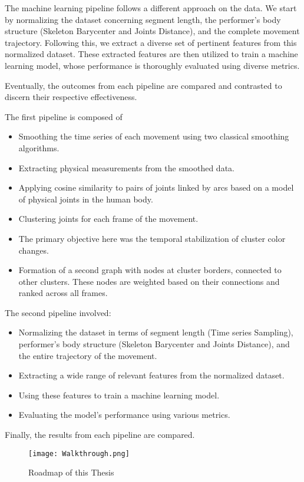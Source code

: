 The machine learning pipeline follows a different approach on the data. 
We start by normalizing the dataset concerning segment length, the performer's body structure (Skeleton Barycenter and Joints Distance), and the complete movement trajectory. 
Following this, we extract a diverse set of pertinent features from this normalized dataset. These extracted features are then utilized to train a machine learning model, whose performance is thoroughly evaluated using diverse metrics.

Eventually, the outcomes from each pipeline are compared and contrasted to discern their respective effectiveness.

The first pipeline is composed of 
\begin{itemize}
    \item Smoothing the time series of each movement using two classical smoothing algorithms.
    \item Extracting physical measurements from the smoothed data.
    \item Applying cosine similarity to pairs of joints linked by arcs based on a model of physical joints in the human body.
    \item Clustering joints for each frame of the movement.
    \item The primary objective here was the temporal stabilization of cluster color changes.
    \item Formation of a second graph with nodes at cluster borders, connected to other clusters. These nodes are weighted based on their connections and ranked across all frames.
\end{itemize}
The second pipeline involved:
\begin{itemize}
    \item Normalizing the dataset in terms of segment length (Time series Sampling), performer's body structure (Skeleton Barycenter and Joints Distance), and the entire trajectory of the movement.
    \item Extracting a wide range of relevant features from the normalized dataset.
    \item Using these features to train a machine learning model.
    \item Evaluating the model's performance using various metrics.
\end{itemize}
Finally, the results from each pipeline are compared.

\clearpage
\begin{figure}[H]
    \centering
    \texttt{[image: Walkthrough.png]}
    \caption{Roadmap of this Thesis}
    \label{fig:walktrough}
\end{figure}